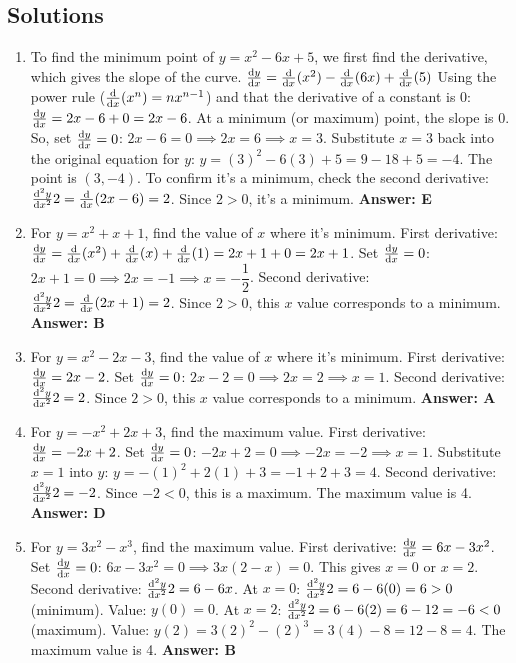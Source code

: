 \subsection{Solutions}
\begin{enumerate}[label={\arabic*.}]
  \item To find the minimum point of \(y = x^2 - 6x + 5\), we first find the derivative, which gives the slope of the curve.
    \(\frac{\mathrm{d}y}{\mathrm{d}x} = \frac{\mathrm{d}}{\mathrm{d}x}(x^2) - \frac{\mathrm{d}}{\mathrm{d}x}(6x) + \frac{\mathrm{d}}{\mathrm{d}x}(5)\)
    Using the power rule (\(\frac{\mathrm{d}}{\mathrm{d}x}(x^n) = nx^{n-1}\)) and that the derivative of a constant is 0:
    \(\frac{\mathrm{d}y}{\mathrm{d}x} = 2x - 6 + 0 = 2x - 6\).
    At a minimum (or maximum) point, the slope is 0. So, set \(\frac{\mathrm{d}y}{\mathrm{d}x} = 0\):
    \(2x - 6 = 0 \implies 2x = 6 \implies x = 3\).
    Substitute \(x=3\) back into the original equation for \(y\):
    \(y = (3)^2 - 6(3) + 5 = 9 - 18 + 5 = -4\).
    The point is \((3, -4)\).
    To confirm it's a minimum, check the second derivative: \(\frac{\mathrm{d}^2 y}{\mathrm{d} x^2}{2} = \frac{\mathrm{d}}{\mathrm{d}x}(2x-6) = 2\). Since \(2 > 0\), it's a minimum.
    \textbf{Answer: E}

  \item For \(y = x^2 + x + 1\), find the value of \(x\) where it's minimum.
    First derivative: \(\frac{\mathrm{d}y}{\mathrm{d}x} = \frac{\mathrm{d}}{\mathrm{d}x}(x^2) + \frac{\mathrm{d}}{\mathrm{d}x}(x) + \frac{\mathrm{d}}{\mathrm{d}x}(1) = 2x + 1 + 0 = 2x + 1\).
    Set \(\frac{\mathrm{d}y}{\mathrm{d}x} = 0\): \(2x + 1 = 0 \implies 2x = -1 \implies x = -\dfrac{1}{2}\).
    Second derivative: \(\frac{\mathrm{d}^2 y}{\mathrm{d} x^2}{2} = \frac{\mathrm{d}}{\mathrm{d}x}(2x+1) = 2\). Since \(2 > 0\), this \(x\) value corresponds to a minimum.
    \textbf{Answer: B}

  \item For \(y = x^2 - 2x - 3\), find the value of \(x\) where it's minimum.
    First derivative: \(\frac{\mathrm{d}y}{\mathrm{d}x} = 2x - 2\).
    Set \(\frac{\mathrm{d}y}{\mathrm{d}x} = 0\): \(2x - 2 = 0 \implies 2x = 2 \implies x = 1\).
    Second derivative: \(\frac{\mathrm{d}^2 y}{\mathrm{d} x^2}{2} = 2\). Since \(2 > 0\), this \(x\) value corresponds to a minimum.
    \textbf{Answer: A}

  \item For \(y = -x^2 + 2x + 3\), find the maximum value.
    First derivative: \(\frac{\mathrm{d}y}{\mathrm{d}x} = -2x + 2\).
    Set \(\frac{\mathrm{d}y}{\mathrm{d}x} = 0\): \(-2x + 2 = 0 \implies -2x = -2 \implies x = 1\).
    Substitute \(x=1\) into \(y\): \(y = -{(1)}^2 + 2(1) + 3 = -1 + 2 + 3 = 4\).
    Second derivative: \(\frac{\mathrm{d}^2 y}{\mathrm{d} x^2}{2} = -2\). Since \(-2 < 0\), this is a maximum. The maximum value is 4.
    \textbf{Answer: D}

  \item For \(y = 3x^2 - x^3\), find the maximum value.
    First derivative: \(\frac{\mathrm{d}y}{\mathrm{d}x} = 6x - 3x^2\).
    Set \(\frac{\mathrm{d}y}{\mathrm{d}x} = 0\): \(6x - 3x^2 = 0 \implies 3x(2 - x) = 0\).
    This gives \(x=0\) or \(x=2\).
    Second derivative: \(\frac{\mathrm{d}^2 y}{\mathrm{d} x^2}{2} = 6 - 6x\).
    At \(x=0\): \(\frac{\mathrm{d}^2 y}{\mathrm{d} x^2}{2} = 6 - 6(0) = 6 > 0\) (minimum). Value: \(y(0)=0\).
    At \(x=2\): \(\frac{\mathrm{d}^2 y}{\mathrm{d} x^2}{2} = 6 - 6(2) = 6 - 12 = -6 < 0\) (maximum). Value: \(y(2) = 3(2)^2 - (2)^3 = 3(4) - 8 = 12 - 8 = 4\).
    The maximum value is 4.
    \textbf{Answer: B}


\end{enumerate}
